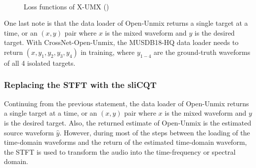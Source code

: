 \documentclass[report.tex]{subfiles}
\begin{document}
\begin{figure}[ht]
	\centering
	\\
	\caption{Loss functions of X-UMX (\cite{xumx})}
	\label{fig:xumxlosses}
\end{figure}

One last note is that the data loader of Open-Unmix returns a single target at a time, or an $(x, y)$ pair where $x$ is the mixed waveform and $y$ is the desired target. With CrossNet-Open-Unmix, the MUSDB18-HQ data loader needs to return $(x, y_{1}, y_{2}, y_{3}, y_{4})$ in training, where $y_{1-4}$ are the ground-truth waveforms of all 4 isolated targets.

\newpagefill

\subsubsection{Replacing the STFT with the sliCQT}
\label{sec:replacestft}

Continuing from the previous statement, the data loader of Open-Unmix returns a single target at a time, or an $(x, y)$ pair where $x$ is the mixed waveform and $y$ is the desired target. Also, the returned estimate of Open-Unmix is the estimated source waveform $\hat{y}$. However, during most of the steps between the loading of the time-domain waveforms and the return of the estimated time-domain waveform, the STFT is used to transform the audio into the time-frequency or spectral domain.
\end{document}
